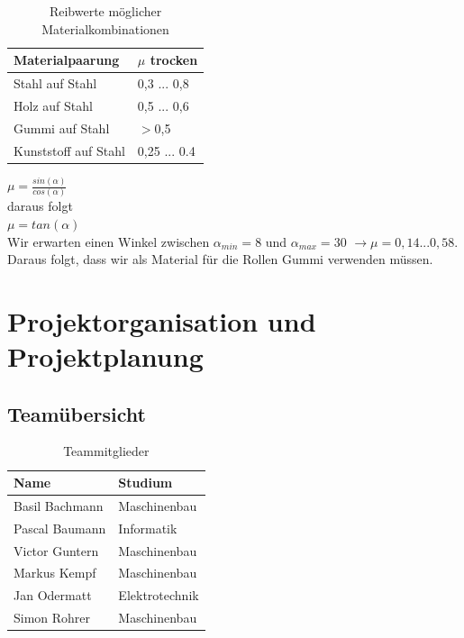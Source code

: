 \documentclass[a4paper]{report}
\begin{document}
\begin{table}[h!]
	\centering
	\begin{tabular}{|p{}|p{}|}
		\hline
		\textbf{Materialpaarung} & \textbf{$\mu$ trocken}\\
		\hline
		Stahl auf Stahl & 0,3 ... 0,8 \\
		\hline
		Holz auf Stahl & 0,5 ... 0,6\\
		\hline
		Gummi auf Stahl & $>$0,5 \\
		\hline
		Kunststoff auf Stahl & 0,25 ... 0.4\\
		\hline
	\end{tabular}
	\caption{Reibwerte möglicher Materialkombinationen \parencite{Wittel2015}}
	\label{tab:Reibwerte}
\end{table}

\noindent
$\mu=\frac{sin(\alpha)}{cos(\alpha)}$\\

\noindent
daraus folgt\\
$\mu=tan(\alpha)$\\
Wir erwarten einen Winkel zwischen $\alpha_{min}=8$ und $\alpha_{max}=30$ $ \rightarrow \mu = 0,14 ... 0,58$. Daraus folgt, dass wir als Material für die Rollen Gummi verwenden müssen.


\chapter{Projektorganisation und Projektplanung}
\label{ch:ProjektOrga}

\section{Teamübersicht}
\label{sec:Teamuebersicht}
\begin{table}[h!]
	\centering
	\begin{tabular}{|p{}|p{}|}
		\hline
		\textbf{Name} & \textbf{Studium} \\
		\hline
		Basil Bachmann & Maschinenbau \\
		\hline
		Pascal Baumann & Informatik \\
		\hline
		Victor Guntern & Maschinenbau \\
		\hline
		Markus Kempf & Maschinenbau \\
		\hline
		Jan Odermatt & Elektrotechnik \\
		\hline
		Simon Rohrer & Maschinenbau \\
		\hline
	\end{tabular}
	\caption{Teammitglieder}
	\label{tab:TeamMitglieder}
\end{table}
\end{document}
